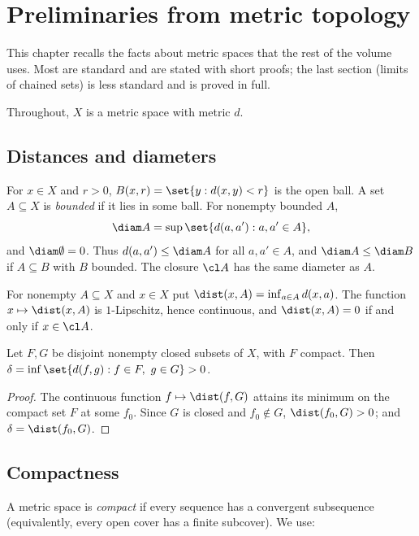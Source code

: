 \chapter{Preliminaries from metric topology}\label{ch:prelim}

This chapter recalls the facts about metric spaces that the rest of the volume uses. Most
are standard and are stated with short proofs; the last section (limits of chained sets)
is less standard and is proved in full.

Throughout, $X$ is a metric space with metric $d$.

\section{Distances and diameters}

For $x\in X$ and $r>0$, $B(x,r)=\set{y : d(x,y)<r}$ is the open ball. A set $A\subseteq X$ is
\emph{bounded} if it lies in some ball. For nonempty bounded $A$,
\[
\diam A=\sup\set{d(a,a') : a,a'\in A},
\]
and $\diam\emptyset=0$. Thus $d(a,a')\le\diam A$ for all $a,a'\in A$, and $\diam A\le\diam B$
if $A\subseteq B$ with $B$ bounded. The closure $\cl A$ has the same diameter as $A$.

For nonempty $A\subseteq X$ and $x\in X$ put $\dist(x,A)=\inf_{a\in A}d(x,a)$. The function
$x\mapsto\dist(x,A)$ is $1$-Lipschitz, hence continuous, and $\dist(x,A)=0$ if and only if
$x\in\cl A$.

\begin{lemma}\label{lem:separated-distance}
Let $F,G$ be disjoint nonempty closed subsets of $X$, with $F$ compact. Then
$\delta=\inf\set{d(f,g): f\in F,\ g\in G}>0$.
\end{lemma}

\begin{proof}
The continuous function $f\mapsto\dist(f,G)$ attains its minimum on the compact set $F$ at
some $f_0$. Since $G$ is closed and $f_0\notin G$, $\dist(f_0,G)>0$; and $\delta=\dist(f_0,G)$.
\end{proof}

\section{Compactness}

A metric space is \emph{compact} if every sequence has a convergent subsequence
(equivalently, every open cover has a finite subcover). We use:


